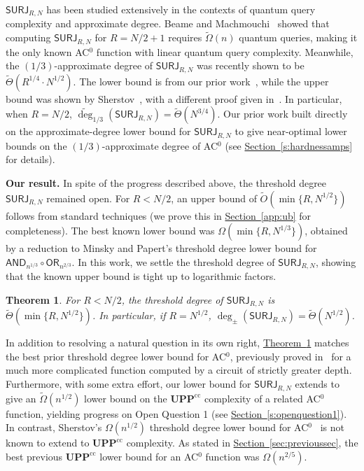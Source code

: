 \documentclass[11pt]{article}
\numberwithin{equation}{section}
\newtheorem{theorem}{Theorem}[section]
\theoremstyle{definition}
\theoremstyle{plain}
\newcommand{\expref}[2]{\hyperref[#2]{#1~\ref{#2}}}
\newcommand{\SURJ}{\mathsf{ SURJ}}
\newcommand{\OR}{\mathsf{ OR}}
\newcommand{\UPP}{\mathbf{UPP}}
\newcommand{\adeg}{\widetilde{\operatorname{deg}}}
\newcommand{\AND}{\mathsf{AND}}
\begin{document}
$\SURJ_{R, N}$ has been studied extensively in the contexts of quantum query complexity and approximate degree. Beame and Machmouchi~\cite{beame} showed that computing $\SURJ_{R, N}$ for $R = N/2 + 1$ requires $\tilde{\Omega}(n)$ quantum queries, making it the only known AC$^0$ function with  linear quantum query complexity. Meanwhile,
the $(1/3)$-approximate degree of $\SURJ_{R, N}$ was recently shown to be $\tilde{\Theta}(R^{1/4} \cdot N^{1/2})$. The lower
bound is from our prior work~\cite{bkt}, while the upper bound
was shown by Sherstov~\cite{algopoly}, with a different proof given in~\cite{bkt}. 
In particular, when $R=N/2$, $\adeg_{1/3}(\SURJ_{R, N}) = \tilde{\Theta}(N^{3/4})$. 
Our prior %
work  %
\cite{adegsurj, bkt} built directly on the
%
approximate-degree %
lower bound for $\SURJ_{R, N}$ to 
give near-optimal lower bounds on the $(1/3)$-approximate degree of AC$^0$ (see \expref{Section}{s:hardnessamps} for details).

\medskip \noindent \textbf{Our result.} 
In spite of the progress described above, the  threshold degree $\SURJ_{R, N}$
remained open. For $R < N/2$, an upper bound of $\tilde{O}(\min\{R, N^{1/2}\})$ follows from standard techniques (we prove
this in \expref{Section}{app:ub} for completeness). The best known lower bound was $\Omega(\min\{R, N^{1/3}\})$, obtained by a reduction
to Minsky and Papert's threshold degree lower bound for $\AND_{n^{1/3}} \circ \OR_{n^{2/3}}$.
In this work, we settle the threshold degree of $\SURJ_{R, N}$, showing that the known upper bound is tight up to logarithmic
factors.

\begin{theorem} \label{thm:surj}
	For $R < N/2$, the threshold degree of $\SURJ_{R, N}$ is
	$\tilde{\Theta}(\min\{R, N^{1/2}\})$. In particular, if $R=N^{1/2}$, $\deg_{\pm}(\SURJ_{R, N}) = \tilde{\Theta}(N^{1/2})$. 
\end{theorem}

In addition to  
resolving a natural question in its own right, \expref{Theorem}{thm:surj} matches the best prior threshold degree lower bound for AC$^0$,
previously proved in~\cite{sherstov15} for a much more complicated  function computed by a circuit of strictly greater depth. 
Furthermore, with some extra effort, our lower bound for $\SURJ_{R, N}$ extends to give an $\tilde{\Omega}(n^{1/2})$ lower
bound on the $\UPP^{\text{cc}}$ complexity of a related AC$^0$ function, yielding progress on Open Question 1
%
(see \expref{Section}{s:openquestion1}).   %
In contrast, Sherstov's  $\Omega(n^{1/2})$ threshold degree lower bound
for AC$^0$~\cite{sherstov15} is not known to extend to $\UPP^{\text{cc}}$ complexity. As stated in \expref{Section}{sec:previoussec}, the best previous $\UPP^{\text{cc}}$ lower bound for an AC$^0$ function was $\Omega(n^{2/5})$.
\end{document}

